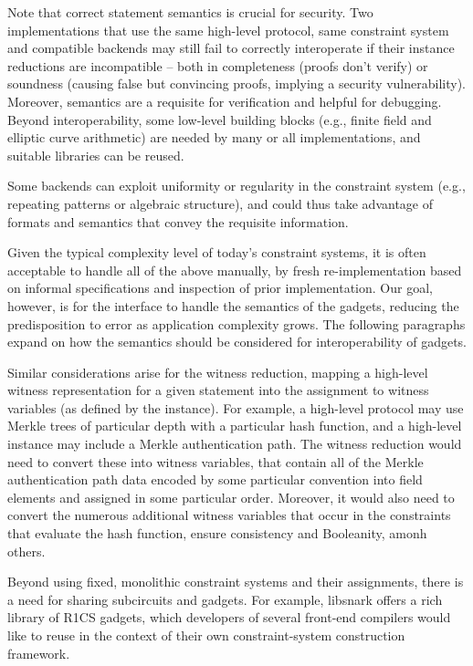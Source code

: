 \documentclass[a4paper,12pt]{article}
\begin{document}
Note that correct statement semantics is crucial for security. Two implementations that use the same high-level protocol, same constraint system and compatible backends may still fail to correctly interoperate if their instance reductions are incompatible -- both in completeness (proofs don’t verify) or soundness (causing false but convincing proofs, implying a security vulnerability). Moreover, semantics are a requisite for verification and helpful for debugging. Beyond interoperability, some low-level building blocks (e.g., finite field and elliptic curve arithmetic) are needed by many or all implementations, and suitable libraries can be reused.

Some backends can exploit uniformity or regularity in the constraint system (e.g., repeating patterns or algebraic structure), and could thus take advantage of formats and semantics that convey the requisite information.

Given the typical complexity level of today’s constraint systems, it is often acceptable to handle all of the above manually, by fresh re-implementation based on informal specifications and inspection of prior implementation. Our goal, however, is for the interface to handle the semantics of the gadgets, reducing the predisposition to error as application complexity grows. The following paragraphs expand on how the semantics should be considered for interoperability of gadgets.

Similar considerations arise for the witness reduction, mapping a high-level witness representation for a given statement into the assignment to witness variables (as defined by the instance). For example, a high-level protocol may use Merkle trees of particular depth with a particular hash function, and a high-level instance may include a Merkle authentication path. The witness reduction would need to convert these into witness variables, that contain all of the Merkle authentication path data encoded by some particular convention into field elements and assigned in some particular order. Moreover, it would also need to convert the numerous additional witness variables that occur in the constraints that evaluate the hash function, ensure consistency and Booleanity, amonh others.

Beyond using fixed, monolithic constraint systems and their assignments, there is a need for sharing subcircuits and gadgets. For example, libsnark offers a rich library of R1CS gadgets, which developers of several front-end compilers would like to reuse in the context of their own constraint-system construction framework. 
\end{document}
